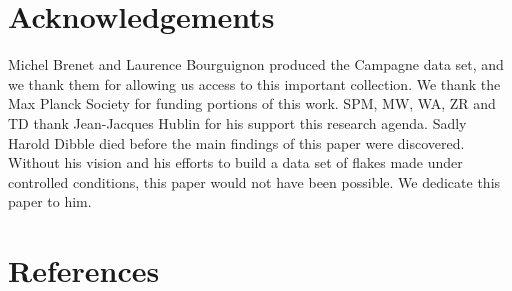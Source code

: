 \documentclass[10pt,letterpaper]{article}
\begin{document}
\hypertarget{acknowledgements}{%
\section{Acknowledgements}\label{acknowledgements}}

Michel Brenet and Laurence Bourguignon produced the Campagne data set,
and we thank them for allowing us access to this important collection.
We thank the Max Planck Society for funding portions of this work. SPM,
MW, WA, ZR and TD thank Jean-Jacques Hublin for his support this
research agenda. Sadly Harold Dibble died before the main findings of
this paper were discovered. Without his vision and his efforts to build
a data set of flakes made under controlled conditions, this paper would
not have been possible. We dedicate this paper to him.

\hypertarget{references}{%
\section*{References}\label{references}}
\end{document}
